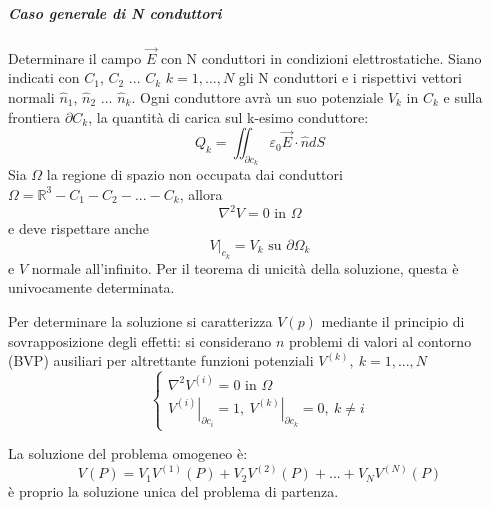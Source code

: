 \subparagraph{Caso generale di N conduttori}
Determinare il campo $\vec{E}$ con N conduttori in condizioni elettrostatiche.
Siano indicati con $C_1$, $C_2$ ... $C_k$ $k=1,...,N$ gli N conduttori e i rispettivi vettori normali
$\hat{n}_1$, $\hat{n}_2$ ... $\hat{n}_k$.
Ogni conduttore avrà un suo potenziale $V_k$ in $C_k$ e sulla frontiera $\partial C_k$, la quantità di carica sul k-esimo conduttore:
$$
Q_k = \iint_{\partial c_k} \varepsilon_0 \vec{E}\cdot\hat{n} dS
$$
Sia $\Omega$ la regione di spazio non occupata dai conduttori $\Omega = \mathbb{R}^3 - C_1 - C_2 -... - C_k$, allora
$$
\nabla^2 V = 0 \text{ in } \Omega 
$$
e deve rispettare anche
$$
\left. V \right|_{c_k} = V_k \text{ su } \partial \Omega_k
$$
e $V$ normale all'infinito.
Per il teorema di unicità della soluzione, questa è univocamente determinata.

Per determinare la soluzione si caratterizza $V(p)$ mediante il principio di sovrapposizione degli effetti:
si considerano $n$ problemi di valori al contorno (BVP) ausiliari per altrettante funzioni
potenziali $V^{(k)},\ k=1,...,N$
$$
\begin{cases}
\nabla^2 V^{(i)} = 0 \text{ in } \Omega \\
\left.V^{(i)}\right|_{\partial c_i} =  1,\ \left.V^{(k)}\right|_{\partial c_k} = 0,\ k \neq i
\end{cases}
$$

La soluzione del problema omogeneo è:
$$
V(P) = V_1 V^{(1)}(P) + V_2 V^{(2)}(P) + ... + V_NV^{(N)}(P)
$$
è proprio la soluzione unica del problema di partenza.

